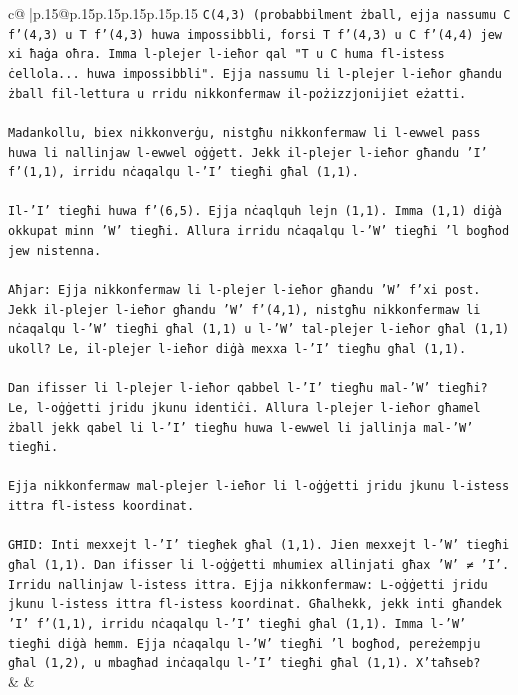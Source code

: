 \documentclass{article}
\begin{document}
{\begin{supertabular}{c@{$\;$}|p{.15\linewidth}@{}p{.15\linewidth}p{.15\linewidth}p{.15\linewidth}p{.15\linewidth}p{.15\linewidth}}
{{{\texttt{C(4,3) (probabbilment żball, ejja nassumu C f'(4,3) u T f'(4,3) huwa impossibbli, forsi T f'(4,3) u C f'(4,4) jew xi ħaġa oħra. Imma l{-}plejer l{-}ieħor qal "T u C huma fl{-}istess ċellola... huwa impossibbli". Ejja nassumu li l{-}plejer l{-}ieħor għandu żball fil{-}lettura u rridu nikkonfermaw il{-}pożizzjonijiet eżatti.} \\
\\ 
\texttt{Madankollu, biex nikkonverġu, nistgħu nikkonfermaw li l{-}ewwel pass huwa li nallinjaw l{-}ewwel oġġett. Jekk il{-}plejer l{-}ieħor għandu 'I' f'(1,1), irridu nċaqalqu l{-}'I' tiegħi għal (1,1).} \\
\\ 
\texttt{Il{-}'I' tiegħi huwa f'(6,5). Ejja nċaqlquh lejn (1,1). Imma (1,1) diġà okkupat minn 'W' tiegħi. Allura irridu nċaqalqu l{-}'W' tiegħi 'l bogħod jew nistenna.} \\
\\ 
\texttt{Aħjar: Ejja nikkonfermaw li l{-}plejer l{-}ieħor għandu 'W' f'xi post. Jekk il{-}plejer l{-}ieħor għandu 'W' f'(4,1), nistgħu nikkonfermaw li nċaqalqu l{-}'W' tiegħi għal (1,1) u l{-}'W' tal{-}plejer l{-}ieħor għal (1,1) ukoll? Le, il{-}plejer l{-}ieħor diġà mexxa l{-}'I' tiegħu għal (1,1).} \\
\\ 
\texttt{Dan ifisser li l{-}plejer l{-}ieħor qabbel l{-}'I' tiegħu mal{-}'W' tiegħi? Le, l{-}oġġetti jridu jkunu identiċi. Allura l{-}plejer l{-}ieħor għamel żball jekk qabel li l{-}'I' tiegħu huwa l{-}ewwel li jallinja mal{-}'W' tiegħi.} \\
\\ 
\texttt{Ejja nikkonfermaw mal{-}plejer l{-}ieħor li l{-}oġġetti jridu jkunu l{-}istess ittra fl{-}istess koordinat.} \\
\\ 
\texttt{GĦID: Inti mexxejt l{-}'I' tiegħek għal (1,1). Jien mexxejt l{-}'W' tiegħi għal (1,1). Dan ifisser li l{-}oġġetti mhumiex allinjati għax 'W' ≠ 'I'. Irridu nallinjaw l{-}istess ittra. Ejja nikkonfermaw: L{-}oġġetti jridu jkunu l{-}istess ittra fl{-}istess koordinat. Għalhekk, jekk inti għandek 'I' f'(1,1), irridu nċaqalqu l{-}'I' tiegħi għal (1,1). Imma l{-}'W' tiegħi diġà hemm. Ejja nċaqalqu l{-}'W' tiegħi 'l bogħod, pereżempju għal (1,2), u mbagħad inċaqalqu l{-}'I' tiegħi għal (1,1). X'taħseb?} \\
            }
        }
    }
    & & \\ \\


\end{supertabular}}
\end{document}
